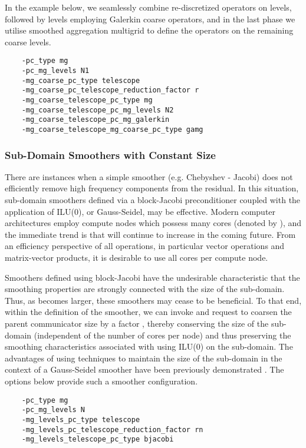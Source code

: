 \documentclass[]{siamart0216}
\begin{document}
	In the example below, we seamlessly combine re-discretized operators on  levels, followed by  levels 
	employing Galerkin coarse operators, and in the last phase we utilise smoothed aggregation multigrid 
	to define the operators on the remaining coarse levels.
\begin{tcolorbox}[colframe=red,colback=cornsilk,boxrule=0.5pt,arc=4pt,
      left=-6pt,right=6pt,top=6pt,bottom=6pt,boxsep=0pt]
	\begin{verbatim}
    -pc_type mg
    -pc_mg_levels N1
    -mg_coarse_pc_type telescope
    -mg_coarse_pc_telescope_reduction_factor r
    -mg_coarse_telescope_pc_type mg
    -mg_coarse_telescope_pc_mg_levels N2
    -mg_coarse_telescope_pc_mg_galerkin
    -mg_coarse_telescope_mg_coarse_pc_type gamg
	\end{verbatim}
\end{tcolorbox}
\subsubsection{Sub-Domain Smoothers with Constant Size} \label{sec:sscontsize}
	There are instances when a simple smoother (e.g. Chebyshev - Jacobi) does not 
	efficiently remove high frequency components from the residual. 
In this situation, sub-domain smoothers defined via a block-Jacobi preconditioner 
	coupled with the application of ILU(0), or Gauss-Seidel, may be effective. 
Modern computer architectures employ compute nodes which possess many cores (denoted by ), and 
	the immediate trend is that  will continue to increase in the coming future.
	From an efficiency perspective of all operations, in particular vector operations and matrix-vector products, 
	it is desirable to use all  cores per compute node. 
	
	Smoothers defined using block-Jacobi have the undesirable characteristic that the smoothing 
	properties are strongly connected with the size of the sub-domain. Thus, as  becomes larger,
	these smoothers may cease to be beneficial. To that end, within the definition of the smoother, 
	we can invoke  and request to coarsen the parent communicator size by a factor , 
	thereby conserving the size of the sub-domain (independent of the number of cores per node) and 
	thus preserving the smoothing characteristics associated with using ILU(0) on the sub-domain. 
	The advantages of using techniques to maintain the size of the sub-domain in the 
	context of a Gauss-Seidel smoother have been previously demonstrated \cite{hoefler2013mpi}.
	The options below provide such a smoother configuration.
\begin{tcolorbox}[colframe=red,colback=cornsilk,boxrule=0.5pt,arc=4pt,
      left=-6pt,right=6pt,top=6pt,bottom=6pt,boxsep=0pt]
	\begin{verbatim}
    -pc_type mg
    -pc_mg_levels N
    -mg_levels_pc_type telescope
    -mg_levels_pc_telescope_reduction_factor rn
    -mg_levels_telescope_pc_type bjacobi
	\end{verbatim}
\end{tcolorbox}
\end{document}
